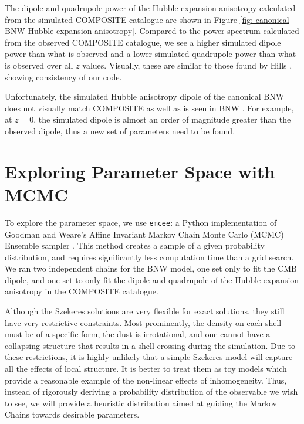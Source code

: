 \documentclass[a4paper,12pt]{report}
\begin{document}
The dipole and quadrupole power of the Hubble expansion anisotropy calculated from the simulated COMPOSITE catalogue are shown in Figure \ref{fig: canonical BNW Hubble expansion anisotropy}. Compared to the power spectrum calculated from the observed COMPOSITE catalogue, we see a higher simulated dipole power than what is observed and a lower simulated quadrupole power than what is observed over all $z$ values. Visually, these are similar to those found by Hills \cite{RN42}, showing consistency of our code.

Unfortunately, the simulated Hubble anisotropy dipole of the canonical BNW does not visually match COMPOSITE as well as is seen in BNW \cite{RN3}. For example, at $z=0$, the simulated dipole is almost an order of magnitude greater than the observed dipole, thus a new set of parameters need to be found.

\section{Exploring Parameter Space with MCMC}\label{section: BNW MCMC}
To explore the parameter space, we use \texttt{emcee}: a Python implementation of Goodman and Weare's Affine Invariant Markov Chain Monte Carlo (MCMC) Ensemble sampler \cite{RN113,RN111}. This method creates a sample of a given probability distribution, and requires significantly less computation time than a grid search. We ran two independent chains for the BNW model, one set only to fit the CMB dipole, and one set to only fit the dipole and quadrupole of the Hubble expansion anisotropy in the COMPOSITE catalogue.

Although the Szekeres solutions are very flexible for exact solutions, they still have very restrictive constraints. Most prominently, the density on each shell must be of a specific form, the dust is irrotational, and one cannot have a collapsing structure that results in a shell crossing during the simulation. Due to these restrictions, it is highly unlikely that a simple Szekeres model will capture all the effects of local structure. It is better to treat them as toy models which provide a reasonable example of the non-linear effects of inhomogeneity. Thus, instead of rigorously deriving a probability distribution of the observable we wish to see, we will provide a heuristic distribution aimed at guiding the Markov Chains towards desirable parameters.
\end{document}
